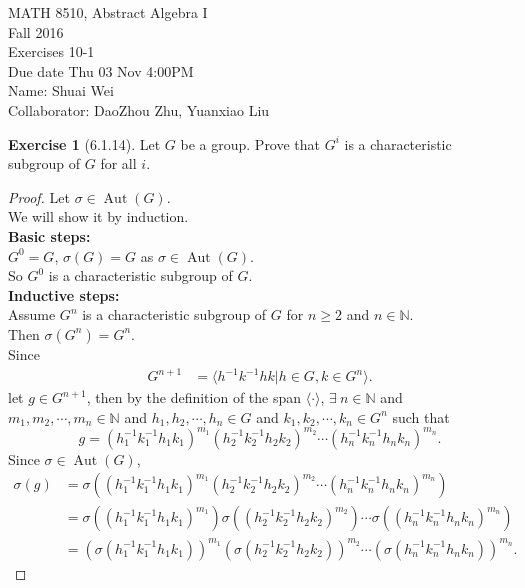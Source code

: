 \documentclass{amsart}
\newcommand{\bbn}{\mathbb{N}}
\theoremstyle{plain}
\theoremstyle{definition}
\newtheorem{exer}[lem]{Exercise}
\begin{document}
\noindent MATH 8510, Abstract Algebra I \\
Fall 2016\\
Exercises 10-1\\
Due date Thu 03 Nov 4:00PM \\
Name: Shuai Wei \\
Collaborator: DaoZhou Zhu, Yuanxiao Liu
\

%
%

\begin{exer}[6.1.14]
Let $G$ be a group. 
Prove that $G^{i}$ is a characteristic subgroup of $G$ for all $i$. 
\begin{proof}
	Let $\sigma \in \operatorname{Aut}(G)$.\\
	We will show it by induction.\\
	\textbf{Basic steps:}\\
	$G^0 = G$, $\sigma(G) = G$ as $\sigma\in \operatorname{Aut}(G)$.\\
	So $G^0$ is a characteristic subgroup of $G$.\\
	\textbf{Inductive steps:}\\
	Assume $G^n$ is a characteristic subgroup of $G$ for $n \geq 2$ and $n \in \bbn$.\\
	Then $\sigma(G^n) = G^n$.\\
	Since 
  	\begin{align*}
	  G^{n+1} &= \langle h^{-1}k^{-1}hk|h \in G, k \in G^n\rangle.
  	\end{align*}
  	let $g \in G^{n+1}$, then by the definition of the span $\langle\cdot\rangle$, $\exists \ n \in \bbn$ and $m_1,m_2,\cdots,m_n \in \bbn$ and $h_1,h_2,\cdots,h_n \in G$ and $k_1,k_2,\cdots,k_n \in G^n$ such that
  	\[g = \left(h_1^{-1}k_1^{-1}h_1k_1\right)^{m_1}\left(h_2^{-1}k_2^{-1}h_2k_2\right)^{m_2}\cdots \left(h_n^{-1}k_n^{-1}h_nk_n\right)^{m_n} .\]
  	Since $\sigma \in \operatorname{Aut}(G)$, 
  	\begin{align*}
  	  \sigma(g) &= \sigma \left(\left(h_1^{-1}k_1^{-1}h_1k_1\right)^{m_1}\left(h_2^{-1}k_2^{-1}h_2k_2\right)^{m_2}\cdots \left(h_n^{-1}k_n^{-1}h_nk_n\right)^{m_n}  \right)\\
  	  			  	   	&=\sigma \left(\left(h_1^{-1}k_1^{-1}h_1k_1\right)^{m_1}\right) \sigma \left(\left(h_2^{-1}k_2^{-1}h_2k_2\right)^{m_2}\right)\cdots \sigma\left(\left (h_n^{-1}k_n^{-1}h_nk_n\right) ^{m_n}\right)		\\
  	  			  	   &=\left(\sigma\left(h_1^{-1}k_1^{-1}h_1k_1\right)\right)^{m_1}  \left(\sigma\left(h_2^{-1}k_2^{-1}h_2k_2\right)\right)^{m_2}\cdots \left(\sigma\left (h_n^{-1}k_n^{-1}h_nk_n\right)\right) ^{m_n}.	

\end{align*}
\end{proof}
\end{exer}
\end{document}
